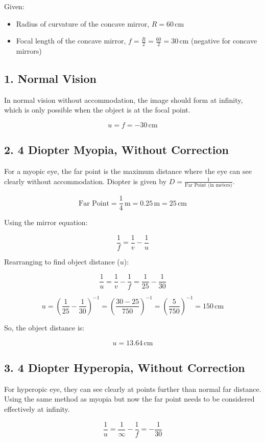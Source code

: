 Given:
\begin{itemize}
    \item Radius of curvature of the concave mirror, $R = 60 \, \text{cm}$
    \item Focal length of the concave mirror, $f = \frac{R}{2} = \frac{60}{2} = 30 \, \text{cm}$ (negative for concave mirrors)
\end{itemize}

\subsection*{1. Normal Vision}
In normal vision without accommodation, the image should form at infinity, which is only possible when the object is at the focal point.

\[
u = f = -30 \, \text{cm}
\]

\subsection*{2. 4 Diopter Myopia, Without Correction}
For a myopic eye, the far point is the maximum distance where the eye can see clearly without accommodation. Diopter is given by $D = \frac{1}{\text{Far Point (in meters)}}$.

\[
\text{Far Point} = \frac{1}{4} \, \text{m} = 0.25 \, \text{m} = 25 \, \text{cm}
\]

Using the mirror equation:

\[
\frac{1}{f} = \frac{1}{v} - \frac{1}{u}
\]

Rearranging to find object distance ($u$):

\[
\frac{1}{u} = \frac{1}{v} - \frac{1}{f} = \frac{1}{25} - \frac{1}{30}
\]

\[
u = \left( \frac{1}{25} - \frac{1}{30} \right)^{-1} = \left( \frac{30 - 25}{750} \right)^{-1} = \left( \frac{5}{750} \right)^{-1} = 150 \, \text{cm}
\]

So, the object distance is:

\[
u = 13.64 \, \text{cm}
\]

\subsection*{3. 4 Diopter Hyperopia, Without Correction}
For hyperopic eye, they can see clearly at points further than normal far distance. Using the same method as myopia but now the far point needs to be considered effectively at infinity.

\[
\frac{1}{u} = \frac{1}{\infty} - \frac{1}{f} = -\frac{1}{30}
\]

